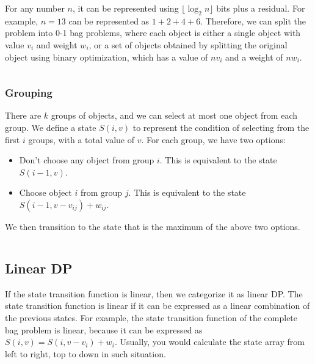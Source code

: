 \documentclass{article}
\begin{document}
For any number $n$, it can be represented using $\lfloor \log_2 n \rfloor$ bits plus a residual. For example, $n = 13$ can be represented as $1 + 2 + 4 + 6$. Therefore, we can split the problem into 0-1 bag problems, where each object is either a single object with value $v_i$ and weight $w_i$, or a set of objects obtained by splitting the original object using binary optimization, which has a value of $nv_i$ and a weight of $nw_i$.

\begin{center}
	\inputminted[firstline=12, lastline=26]{cpp}{src/struct-multiple-bag.cpp}
\end{center}

\subsubsection{Grouping}

There are $k$ groups of objects, and we can select at most one object from each group. We define a state $S(i, v)$ to represent the condition of selecting from the first $i$ groups, with a total value of $v$. For each group, we have two options:
\begin{itemize}
	\item Don't choose any object from group $i$. This is equivalent to the state $S(i - 1, v)$.
	\item Choose object $i$ from group $j$. This is equivalent to the state $S(i - 1, v - v_{ij}) + w_{ij}$.
\end{itemize}

We then transition to the state that is the maximum of the above two options.

\begin{center}
	\inputminted{cpp}{src/struct-group-bag.cpp}
\end{center}

\subsection{Linear DP}

If the state transition function is linear, then we categorize it as linear DP. The state transition function is linear if it can be expressed as a linear combination of the previous states. For example, the state transition function of the complete bag problem is linear, because it can be expressed as $S(i, v) = S(i, v - v_i) + w_i$. Usually, you would calculate the state array from left to right, top to down in such situation.
\end{document}
